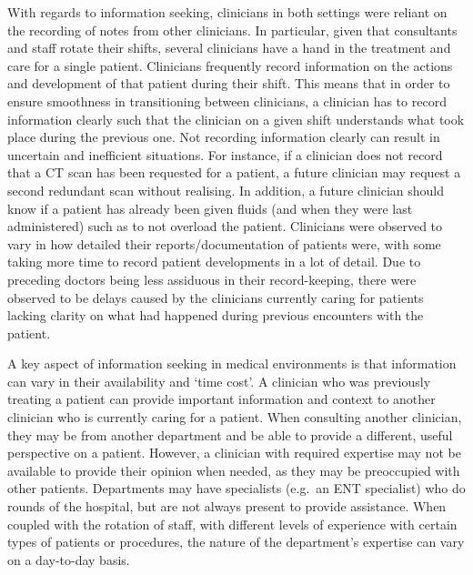 \documentclass[a4paper, nobind]{templates/ociamthesis}
\begin{document}
With regards to information seeking, clinicians in both settings were reliant on the recording of notes from other clinicians. In particular, given that consultants and staff rotate their shifts, several clinicians have a hand in the treatment and care for a single patient. Clinicians frequently record information on the actions and development of that patient during their shift. This means that in order to ensure smoothness in transitioning between clinicians, a clinician has to record information clearly such that the clinician on a given shift understands what took place during the previous one. Not recording information clearly can result in uncertain and inefficient situations. For instance, if a clinician does not record that a CT scan has been requested for a patient, a future clinician may request a second redundant scan without realising. In addition, a future clinician should know if a patient has already been given fluids (and when they were last administered) such as to not overload the patient. Clinicians were observed to vary in how detailed their reports/documentation of patients were, with some taking more time to record patient developments in a lot of detail. Due to preceding doctors being less assiduous in their record-keeping, there were observed to be delays caused by the clinicians currently caring for patients lacking clarity on what had happened during previous encounters with the patient.

\hfill\break
A key aspect of information seeking in medical environments is that information can vary in their availability and `time cost'. A clinician who was previously treating a patient can provide important information and context to another clinician who is currently caring for a patient. When consulting another clinician, they may be from another department and be able to provide a different, useful perspective on a patient. However, a clinician with required expertise may not be available to provide their opinion when needed, as they may be preoccupied with other patients. Departments may have specialists (e.g.~an ENT specialist) who do rounds of the hospital, but are not always present to provide assistance. When coupled with the rotation of staff, with different levels of experience with certain types of patients or procedures, the nature of the department's expertise can vary on a day-to-day basis.
\end{document}
